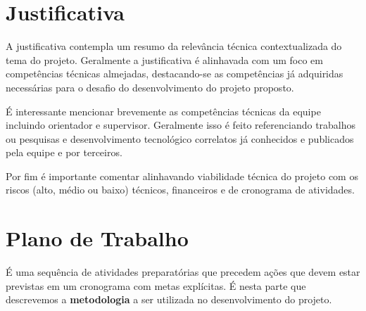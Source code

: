 
\section{Justificativa}

A justificativa  contempla um resumo da relevância técnica contextualizada do tema do projeto.
Geralmente a justificativa é alinhavada com um foco em competências técnicas almejadas, destacando-se as competências já adquiridas necessárias para o desafio do desenvolvimento do projeto proposto.  

É interessante  mencionar brevemente as competências técnicas da equipe incluindo orientador e supervisor. 
Geralmente isso é feito referenciando trabalhos ou pesquisas e desenvolvimento tecnológico correlatos já conhecidos e publicados pela equipe e por terceiros. 

Por fim é importante comentar alinhavando viabilidade técnica do projeto com os riscos (alto, médio ou baixo)  técnicos, financeiros e de cronograma de atividades.

\section{Plano de Trabalho}

É uma sequência de atividades preparatórias que precedem ações que devem estar previstas em um cronograma com metas explícitas. É nesta parte que descrevemos a \textbf{metodologia} a ser utilizada no desenvolvimento do projeto.


